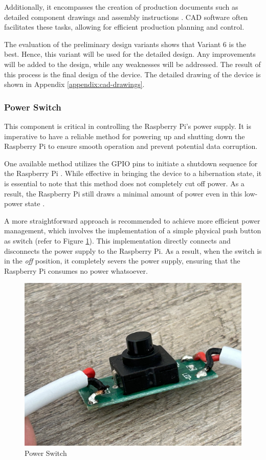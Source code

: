 Additionally, it encompasses the creation of production documents such as detailed component drawings and assembly instructions \cite[436]{Pahl2007}. CAD software often facilitates these tasks, allowing for efficient production planning and control.

The evaluation of the preliminary design variants shows that Variant 6 is the best. Hence, this variant will be used for the detailed design. Any improvements will be added to the design, while any weaknesses will be addressed. The result of this process is the final design of the device. The detailed drawing of the device is shown in Appendix \ref{appendix:cad-drawings}.

\subsubsection{Power Switch}
This component is critical in controlling the Raspberry Pi's power supply. It is imperative to have a reliable method for powering up and shutting down the Raspberry Pi to ensure smooth operation and prevent potential data corruption.

One available method utilizes the GPIO pins to initiate a shutdown sequence for the Raspberry Pi \cite{Labidi21}. While effective in bringing the device to a hibernation state, it is essential to note that this method does not completely cut off power. As a result, the Raspberry Pi still draws a minimal amount of power even in this low-power state \cite{jdb}.

A more straightforward approach is recommended to achieve more efficient power management, which involves the implementation of a simple physical push button as switch (refer to Figure \ref{fig:power_switch}). This implementation directly connects and disconnects the power supply to the Raspberry Pi. As a result, when the switch is in the \textit{off} position, it completely severs the power supply, ensuring that the Raspberry Pi consumes no power whatsoever.

\begin{figure}[!ht]
    \centering
    \includegraphics[height=5 cm]{texs/Part1/chapter4/image/d00.jpg}
    \caption{Power Switch}
    \label{fig:power_switch}
\end{figure}

